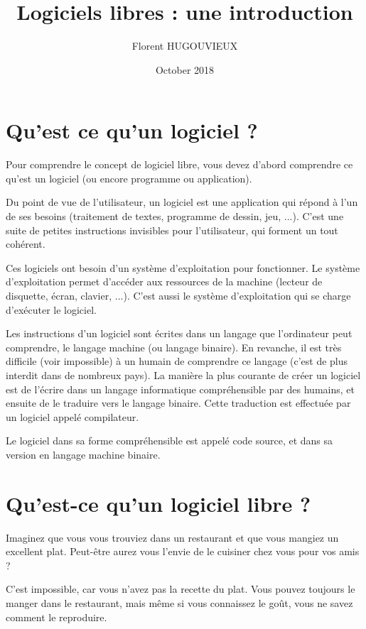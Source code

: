 \documentclass{article}
\title{Logiciels libres : une introduction}
\author{Florent HUGOUVIEUX }
\date{October 2018}
\begin{document}
\maketitle

\tableofcontents
\newpage

\section{Qu'est ce qu'un logiciel ?}

Pour comprendre le concept de logiciel libre, vous devez d'abord comprendre ce qu'est un logiciel (ou encore programme ou application).

Du point de vue de l'utilisateur, un logiciel est une application qui répond à l'un de ses besoins (traitement de textes, programme de dessin, jeu, ...). C'est une suite de petites instructions invisibles pour l'utilisateur, qui forment un tout cohérent.

Ces logiciels ont besoin d'un système d'exploitation pour fonctionner. Le système d'exploitation permet d'accéder aux ressources de la machine (lecteur de disquette, écran, clavier, ...). C'est aussi le système d'exploitation qui se charge d'exécuter le logiciel.

Les instructions d'un logiciel sont écrites dans un langage que l'ordinateur peut comprendre, le langage machine (ou langage binaire). En revanche, il est très difficile (voir impossible) à un humain de comprendre ce langage (c'est de plus interdit dans de nombreux pays). La manière la plus courante de créer un logiciel est de l'écrire dans un langage informatique compréhensible par des humains, et ensuite de le traduire vers le langage binaire. Cette traduction est effectuée par un logiciel appelé compilateur.

Le logiciel dans sa forme compréhensible est appelé code source, et dans sa version en langage machine binaire.
\section{Qu'est-ce qu'un logiciel libre ?}

Imaginez que vous vous trouviez dans un restaurant et que vous mangiez un excellent plat. Peut-être aurez vous l'envie de le cuisiner chez vous pour vos amis ?

C'est impossible, car vous n'avez pas la recette du plat. Vous pouvez toujours le manger dans le restaurant, mais même si vous connaissez le goût, vous ne savez comment le reproduire.
\end{document}
